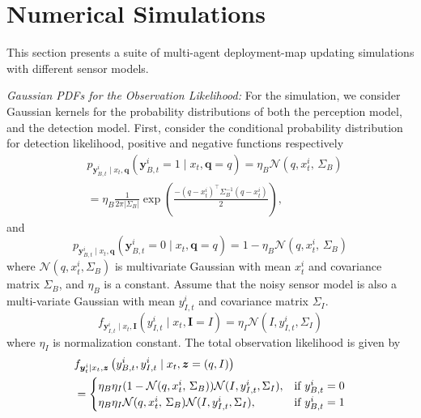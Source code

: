 \documentclass[letterpaper, 10 pt, conference]{ieeeconf}
\begin{document}
\section{Numerical Simulations}
\label{sec:sec7}
This section presents a suite of multi-agent deployment-map updating simulations with different sensor models.

\textit{Gaussian PDFs for the Observation Likelihood:}
For the simulation, we consider Gaussian kernels for the probability distributions of both the perception model, and the detection model.
First, consider the conditional probability distribution for detection likelihood, positive and negative functions respectively
\begin{align*}
&p_{
	\bm{y}_{B,t}^i\mid
	x_t,\bm{q}
}(\bm{y}_{B,t}^i=1\mid x_t,\bm{q}=q)
=\eta_{B}\mathcal{N}(q,x_t^i,\,\Sigma_B) \\
& = \eta_{B}\frac{1}{2\pi\left|\Sigma_B\right|}
\exp\left(
\frac{-(q-x_t^i)^{\top}\Sigma_B^{-1}(q-x_t^i)}{2}
\right),
\end{align*}
and 
\[
p_{
	\bm{y}_{B,t}^i\mid
	x_t,\bm{q}
}(\bm{y}_{B,t}^i=0\mid x_t,\bm{q}=q)
=1-\eta_{B}\mathcal{N}(q,x_t^i,\,\Sigma_B)
\]
where $\mathcal{N}(q,x_t^i,\Sigma_B)$ is multivariate Gaussian with mean $x_t^i$ and covariance matrix $\Sigma_B$, and $\eta_{B}$ is a constant.
Assume that the noisy sensor model is also a multi-variate Gaussian with mean $y_{I,t}^i$ and covariance matrix $\Sigma_I$.
\[
f_{
	\bm{y}_{I,t}^i\mid
	x_t,\bm{I}
}(y_{I,t}^i\mid x_t,\bm{I}=I)
=
\eta_I \mathcal{N}(I,y_{I,t}^i,\Sigma_I)
\]
where $\eta_I$ is normalization constant. The total observation likelihood is given by
\begin{align*}
&f_{\bm{y}_t^i\mid x_t,\bm{z}}
\left(
y_{B,t}^i,y_{I,t}^i \mid x_t,\bm{z}=(q,I)
\right) \\
&=\begin{cases}
\eta_B\eta_I(1-\mathcal{N}(q,x_t^i,\,\Sigma_B))\mathcal{N}(I,y_{I,t}^i,\Sigma_I)
, &\textup{if }y_{B,t}^i = 0 \\
\eta_B\eta_I\mathcal{N}(q,x_t^i,\,\Sigma_B)
\mathcal{N}(I,y_{I,t}^i,\Sigma_I)
, &\textup{if }y_{B,t}^i = 1
\end{cases}
\end{align*}
\end{document}
